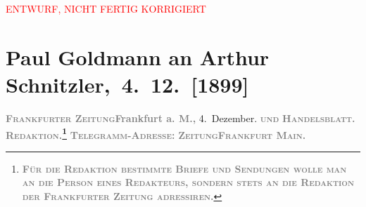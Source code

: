 
\begin{center}
            \textcolor{red}{ENTWURF, NICHT FERTIG KORRIGIERT}
                      \end{center}
            
         
         \renewcommand{\erwaehntePersonen}{Personen: Berthold Frischauer, Theodore Rottenberg}
         \renewcommand{\erwaehnteInstitutionen}{Institutionen: Frankfurter Zeitung, Neue Freie Presse}
         \renewcommand{\erwaehnteOrte}{Orte: Berlin, Frankfurt am Main, Gärtnerweg, Paris, Wien}
         \renewcommand{\erwaehnteWerke}{}
               \section[ Paul Goldmann an Arthur Schnitzler, 4. 12. {[}1899{]}]{ Paul Goldmann an Arthur Schnitzler, 4. 12. {[}1899{]}}\nopagebreak{}\rehead{ }\begin{ledgroupsized}[t]{13cm}\normalsize\beginnumbering \toendnotes[C]{\smallbreak\pagebreak[2]} 
\toendnotes[C]{\smallbreak}\pstart
           \noindent{}{\pb}\textcolor{gray}{\textbf{\textsc{Frankfurter Zeitung}}}\hfill \textcolor{gray}{\textbf{Frankfurt a. M.,}}{ }4. Dezember.\pend
           \pstart
           \textsc{\textcolor{gray}{\textbf{und}}}\pend
           \pstart
           \textcolor{gray}{\textbf{\textsc{Handelsblatt.}}}\pend
           \pstart
           \textcolor{gray}{\textbf{\textsc{Redaktion.\footnote{\noindent{}\textcolor{gray}{\textbf{\textsc{Für die Redaktion beſtimmte Briefe und Sendungen
                                    wolle man  an die Perſon eines
                                    Redakteurs, ſondern ſtets \textbf{an die Redaktion der
                                          Frankfurter Zeitung} adreſſiren.}}}}}}}\pend
           \pstart
           \textcolor{gray}{\textbf{\textsc{Telegramm-Adreſſe:}}}\pend
           \pstart
           \textcolor{gray}{\textbf{\textsc{ZeitungFrankfurt Main.}}}\pend

\end{ledgroupsized}
